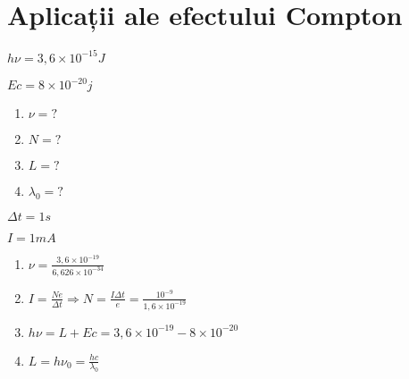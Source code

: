 \documentclass{article}
\begin{document}
\section*{Aplicații ale efectului Compton}
\begin{multicols}{2}
	$h\nu = 3,6 \times 10^{-15} J$

	$E c = 8 \times 10^{-20} j$

	\begin{enumerate}[label=\alph*)]
		\item $\nu = ?$
		\item $N = ?$
		\item $L = ?$
		\item $\lambda_0 = ?$
	\end{enumerate}

	$\Delta t = 1s$

	$I = 1mA$

	\columnbreak

	\begin{enumerate}[label=\alph*)]
		\item $\nu = \frac{3,6 \times 10^{-19}}{6,626 \times 10^{-34}}$
		\item $I = \frac{Ne}{\Delta t} \Rightarrow N = \frac{I \Delta t}{e} = \frac{10^{-9}}{1,6 \times 10^{-19}}$
		\item $h\nu = L + E c = 3,6 \times 10^{-19} - 8 \times 10^{-20}$
		\item $L = h\nu_0 = \frac{h c}{\lambda_0}$
	\end{enumerate}
\end{multicols}
\end{document}
